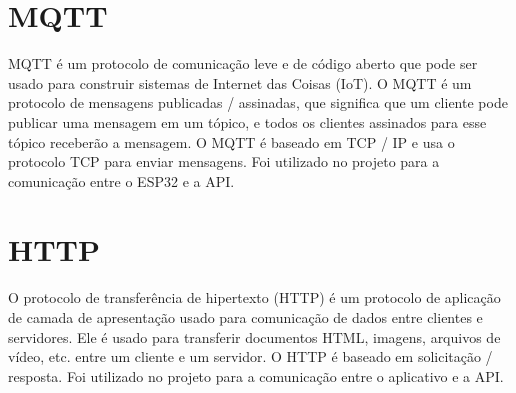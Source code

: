 \section{MQTT}
MQTT é um protocolo de comunicação leve e de código aberto que pode ser usado para construir sistemas de Internet das Coisas (IoT). O MQTT é um protocolo de mensagens publicadas / assinadas, que significa que um cliente pode publicar uma mensagem em um tópico, e todos os clientes assinados para esse tópico receberão a mensagem. O MQTT é baseado em TCP / IP e usa o protocolo TCP para enviar mensagens. Foi utilizado no projeto para a comunicação entre o ESP32 e a API.

\section{HTTP}
O protocolo de transferência de hipertexto (HTTP) é um protocolo de aplicação de camada de apresentação usado para comunicação de dados entre clientes e servidores. Ele é usado para transferir documentos HTML, imagens, arquivos de vídeo, etc. entre um cliente e um servidor. O HTTP é baseado em solicitação / resposta. Foi utilizado no projeto para a comunicação entre o aplicativo e a API.
